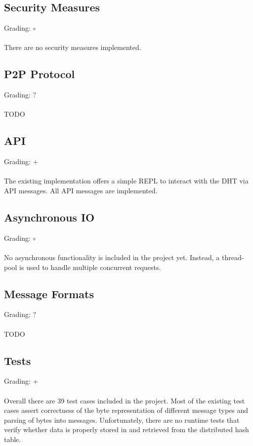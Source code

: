 \documentclass[a4paper, 11pt]{article}
\begin{document}
\subsection*{Security Measures}
Grading: $\circ$\\
\\
There are no security measures implemented.


\subsection*{P2P Protocol}
Grading: $?$\\
\\
TODO


\subsection*{API}
Grading: $+$\\
\\
The existing implementation offers a simple REPL to interact with the DHT via API messages. All API messages are implemented.

\subsection*{Asynchronous IO}
Grading: $\circ$\\
\\
No asynchronous functionality is included in the project yet. 
Instead, a thread-pool is used to handle multiple concurrent requests.


\subsection*{Message Formats}
Grading: $?$\\
\\
TODO


\subsection*{Tests}
Grading: $+$\\
\\
Overall there are 39 test cases included in the project.
Most of the existing test cases assert correctness of the byte representation of different message types and parsing of bytes into messages.
Unfortunately, there are no runtime tests that verify whether data is properly stored in and retrieved from the distributed hash table.
\end{document}
